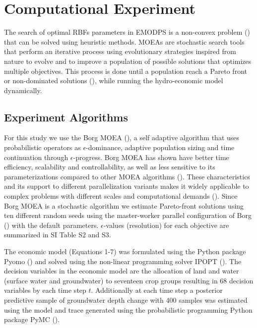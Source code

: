 \documentclass[11pt,a4paper]{article}
\begin{document}
\section{Computational Experiment}

The search of optimal RBFs parameters in EMODPS is a non-convex problem (\cite{giuliani_curses_2016}) that can be solved using heuristic methods. MOEAs are stochastic search tools that perform an iterative process using evolutionary strategies inspired from nature to evolve and to improve a population of possible solutions that optimizes multiple objectives. This process is done until a population reach a Pareto front or non-dominated solutions (\cite{coello_evolutionary_2007}), while running the hydro-economic model dynamically. 

\subsection{Experiment Algorithms}  

For this study we use the Borg MOEA (\cite{hadka_borg_2013}), a self adaptive algorithm that uses probabilistic operators as $\epsilon$-dominance, adaptive population sizing and time continuation through $\epsilon$-progress. Borg MOEA has shown have better time efficiency, scalability and controllability, as well as less sensitive to its parameterizations compared to other MOEA algorithms (\cite{reed_evolutionary_2013}).  These characteristics and its support to different parallelization variants makes it widely applicable to complex problems with different scales and computational demands (\cite{hadka_large-scale_2015}). Since Borg MOEA is a stochastic algorithm we estimate Pareto-front solutions using ten different random seeds using the master-worker parallel configuration of Borg (\cite{hadka_large-scale_2015}) with the default parameters. $\epsilon$-values (resolution) for each objective are summarized in SI Table S2 and S3. 

The economic model (Equations 1-7) was formulated using the Python package Pyomo (\cite{hart_pyomo_2011}) and solved using the non-linear programming solver IPOPT (\cite{wachter_implementation_2006}). The decision variables in the economic model are the allocation of land and water (surface water and groundwater) to seventeen crop groups resulting in 68 decision variables by each time step $t$. Additionally at each time step a posterior predictive sample of groundwater depth change with 400 samples was estimated using the model and trace generated using the probabilistic programming Python package PyMC  (\cite{salvatier_probabilistic_2016}).
\end{document}
